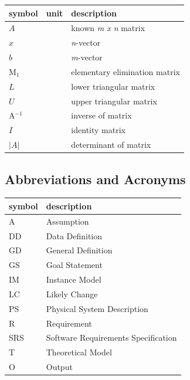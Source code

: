 \documentclass[12pt]{article}
\begin{document}
\renewcommand{\arraystretch}{1.2}
\noindent \begin{longtable*}{l l p{12cm}} \toprule
\textbf{symbol} & \textbf{unit} & \textbf{description}\\
\midrule


$A$ & \text{-} & known \textit{m x n} matrix \\
$x$ & \text{-} & \textit{n}-vector\\
$b$ & \text{-} & \textit{m}-vector\\
M$_{1}$ & \text{-} & elementary elimination matrix\\
$L$ & \text{-} & lower triangular matrix\\
$U$ & \text{-} & upper triangular matrix\\ 
A$^{-1}$ & \text{-} & inverse of matrix \\
$I$ & \text{-} & identity matrix\\
{${|A|}$} & \text{-} & determinant of matrix\\ 

\bottomrule
\end{longtable*}


\subsection{Abbreviations and Acronyms}

\renewcommand{\arraystretch}{1.2}
\begin{tabular}{l l} 
  \toprule		
  \textbf{symbol} & \textbf{description}\\
  \midrule 
  A & Assumption\\
  DD & Data Definition\\
  GD & General Definition\\
  GS & Goal Statement\\
  IM & Instance Model\\
  LC & Likely Change\\
  PS & Physical System Description\\
  R & Requirement\\
  SRS & Software Requirements Specification\\

  T & Theoretical Model\\
  O & Output\\
  \bottomrule
\end{tabular}\\
\end{document}
